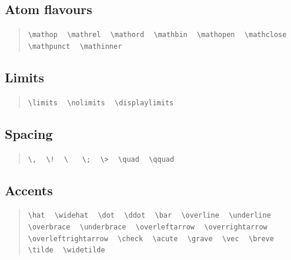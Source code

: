 \documentclass{article}
\newcommand{\texcommand}[1]{\textbackslash{}#1}
\newcommand{\spacer}{\,\,\, \hfil}
\newcommand{\lastspacer}{\hfill\hfill\hfill}
\newenvironment{mylist}{\begin{quote}}{\end{quote}}
\begin{document}
\subsection{Atom flavours}

\begin{mylist}
\texttt{\texcommand{mathop}} \spacer
\texttt{\texcommand{mathrel}} \spacer
\texttt{\texcommand{mathord}} \spacer
\texttt{\texcommand{mathbin}} \spacer
\texttt{\texcommand{mathopen}} \spacer
\texttt{\texcommand{mathclose}} \spacer
\texttt{\texcommand{mathpunct}} \spacer
\texttt{\texcommand{mathinner}} \lastspacer
\end{mylist}

\subsection{Limits}

\begin{mylist}
\texttt{\texcommand{limits}} \spacer
\texttt{\texcommand{nolimits}} \spacer
\texttt{\texcommand{displaylimits}} \lastspacer
\end{mylist}

\subsection{Spacing}

\begin{mylist}
\texttt{\texcommand{,}} \spacer
\texttt{\texcommand{!}} \spacer
\texttt{\texcommand{ }} \spacer
\texttt{\texcommand{;}} \spacer
\texttt{\texcommand{>}} \spacer
\texttt{\texcommand{quad}} \spacer
\texttt{\texcommand{qquad}} \lastspacer
\end{mylist}

\subsection{Accents}

\begin{mylist}
\texttt{\texcommand{hat}} \spacer
\texttt{\texcommand{widehat}} \spacer
\texttt{\texcommand{dot}} \spacer
\texttt{\texcommand{ddot}} \spacer
\texttt{\texcommand{bar}} \spacer
\texttt{\texcommand{overline}} \spacer
\texttt{\texcommand{underline}} \spacer
\texttt{\texcommand{overbrace}} \spacer
\texttt{\texcommand{underbrace}} \spacer
\texttt{\texcommand{overleftarrow}} \spacer
\texttt{\texcommand{overrightarrow}} \spacer
\texttt{\texcommand{overleftrightarrow}} \spacer
\texttt{\texcommand{check}} \spacer
\texttt{\texcommand{acute}} \spacer
\texttt{\texcommand{grave}} \spacer
\texttt{\texcommand{vec}} \spacer
\texttt{\texcommand{breve}} \spacer
\texttt{\texcommand{tilde}} \spacer
\texttt{\texcommand{widetilde}} \lastspacer
\end{mylist}
\end{document}
